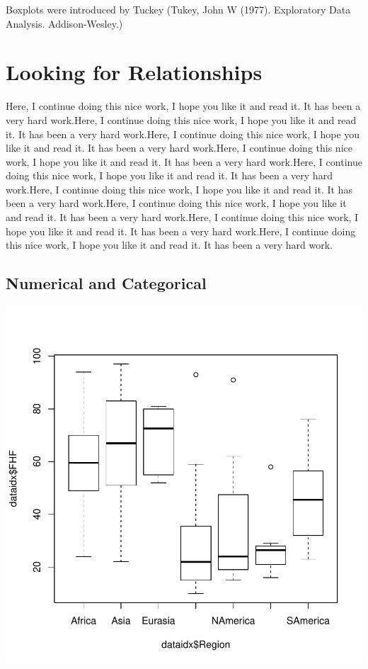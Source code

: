 \documentclass[11pt]{article}
\begin{document}
Boxplots were introduced by Tuckey (Tukey, John W (1977). Exploratory Data Analysis. Addison-Wesley.)

\section{Looking for Relationships}\label{bivar}


Here, I continue doing this nice work, I hope you like it and read it. It has been a very hard work.Here, I continue doing this nice work, I hope you like it and read it. It has been a very hard work.Here, I continue doing this nice work, I hope you like it and read it. It has been a very hard work.Here, I continue doing this nice work, I hope you like it and read it. It has been a very hard work.Here, I continue doing this nice work, I hope you like it and read it. It has been a very hard work.Here, I continue doing this nice work, I hope you like it and read it. It has been a very hard work.Here, I continue doing this nice work, I hope you like it and read it. It has been a very hard work.Here, I continue doing this nice work, I hope you like it and read it. It has been a very hard work.Here, I continue doing this nice work, I hope you like it and read it. It has been a very hard work.

\subsection{Numerical and  Categorical}\label{binumcat}

\includegraphics{PaperInR_3-numcat_plot}
\end{document}
